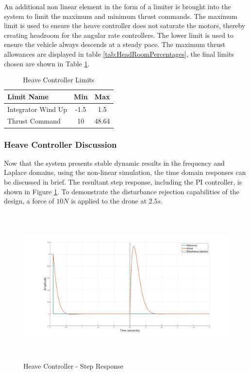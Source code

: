 	 An additional non linear element in the form of a limiter is brought into the system to limit the maximum and minimum thrust commands. The maximum limit is used to ensure the heave controller does not saturate the motors, thereby creating headroom for the angular rate controllers. The lower limit is used to ensure the vehicle always descends at a steady pace. The maximum thrust allowances are displayed in table \ref{tab:HeadRoomPercentages}, the final limits chosen are shown in Table \ref{tab:HeaveLimits}.
	 
	 \begin{table}[!]
	 	\centering
	 	\begin{tabular}{l | c | c |}
	 		Limit Name 				& Min & Max\\
	 		\hline\hline
	 		Integrator Wind Up 	   	& -1.5 	& 1.5 \\
	 		Thrust Command 		    & 10	& 48.64 \\
	 	\end{tabular}
	 	\caption{Heave Controller Limits}
	 	\label{tab:HeaveLimits}
	 \end{table}
	 
		 \subsubsection{Heave Controller Discussion}
		 Now that the system presents stable dynamic results in the frequency and Laplace domains, using the non-linear simulation, the time domain responses can be discussed in brief. The resultant step response, including the PI controller, is shown in Figure \ref{IM_HeaveStepDist}. To demonstrate the disturbance rejection capabilities of the design, a force of $10N$ is applied to the drone at $2.5s$.
		 
		 \begin{figure}[H]
		 	\centering
		 	\includegraphics[height = 8cm]{../Design/Matlab/Controllers/heave_step.jpg}
		 	\caption{Heave Controller -  Step Response}
		 	\label{IM_HeaveStepDist}
		 \end{figure}
		 
